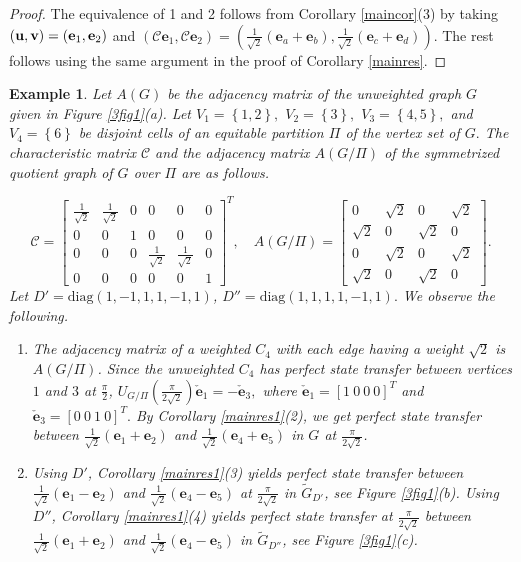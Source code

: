 \documentclass[12pt,a4paper]{article}
\newtheorem{exa}{Example}
\def \e {{\bf e}}
\def \u {{\bf u}}
\def \v {{\bf v}}
\def \e {{\mathbf e}}
\newcommand{\ob}[1]{\left(#1\right)}
\newcommand{\cb}[1]{\left\lbrace #1\right\rbrace}
\newcommand{\tb}[1]{\left[#1\right]}
\begin{document}
\begin{proof}
The equivalence of 1 and 2 follows from Corollary \ref{maincor}(3) by taking $(\u,\v)=(\e_1,\e_2)$ and
$(\mathcal{C}\e_1,\mathcal{C}\e_2)=\left(\frac{1}{\sqrt2}(\e_a+\e_b),\frac{1}{\sqrt2}(\e_c+\e_d)\right)$. The rest follows using the same argument in the proof of Corollary \ref{mainres}.
\end{proof}



\begin{exa}
Let $A(G)$ be the adjacency matrix of the unweighted graph $G$ given in Figure \ref{3fig1}(a). Let $V_1=\cb{1,2},$ $V_2=\cb{3},$ $V_3=\cb{4,5},$ and $V_4=\cb{6}$ be disjoint cells of an equitable partition $\Pi$ of the vertex set of $G.$ The characteristic matrix $\mathcal{C}$ and the adjacency matrix $A(G/\Pi)$ of the symmetrized quotient graph of $G$ over $\Pi$ are as follows.

\[\mathcal{C}=\begin{bmatrix}
\frac{1}{\sqrt{2}} & \frac{1}{\sqrt{2}} & 0 & 0 & 0 & 0\\
0 & 0 & 1 & 0 & 0 & 0\\
0 & 0 & 0 & \frac{1}{\sqrt{2}} & \frac{1}{\sqrt{2}} & 0\\
0 & 0 & 0 & 0 & 0 & 1
\end{bmatrix}^T, \quad A(G/\Pi)=\begin{bmatrix}
0 & \sqrt{2} & 0 & \sqrt{2}\\
\sqrt{2} & 0 & \sqrt{2} & 0 \\
0 & \sqrt{2} & 0 & \sqrt{2} \\
\sqrt{2} & 0 & \sqrt{2} & 0
\end{bmatrix}.\]
Let $D'=\text{diag}\ob{1, -1, 1, 1, -1, 1}$, $D''=\text{diag}\ob{1, 1, 1, 1, -1, 1}.$ We observe the following.

\begin{enumerate}
\item The adjacency matrix of a weighted $C_4$ with each edge having a weight $\sqrt{2}$ is $A(G/\Pi)$. Since the unweighted $C_4$ has perfect state transfer between vertices $1$ and $3$ at $\frac{\pi}{2}$, $U_{G/\Pi}\ob{\frac{\pi}{2\sqrt 2}}\check{\e}_1=-\check{\e}_3,$ where $\check{\e}_1=\tb{1~0~0~0}^T$ and $\check{\e}_3=\tb{0~0~1~0}^T.$ By Corollary \ref{mainres1}(2), we get perfect state transfer between $\frac{1}{\sqrt2}(\e_1+\e_2)$ and $\frac{1}{\sqrt2}(\e_4+\e_5)$ in $G$ at $\frac{\pi}{2\sqrt 2}$. 

\item Using $D'$, Corollary \ref{mainres1}(3) yields perfect state transfer between $\frac{1}{\sqrt2}(\e_1-\e_2)$ and $\frac{1}{\sqrt2}(\e_4-\e_5)$ at $\frac{\pi}{2\sqrt 2}$ in $\tilde{G}_{D'}$, see Figure \ref{3fig1}(b). Using $D''$, Corollary \ref{mainres1}(4) yields perfect state transfer at $\frac{\pi}{2\sqrt 2}$ between $\frac{1}{\sqrt2}(\e_1+\e_2)$ and $\frac{1}{\sqrt2}(\e_4-\e_5)$ in $\tilde{G}_{D''}$, see Figure \ref{3fig1}(c). 
\end{enumerate}
\end{exa}
\end{document}
